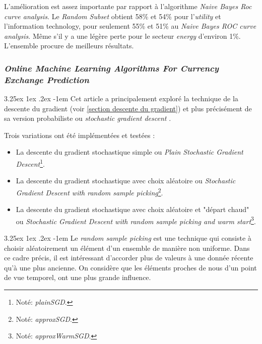 \documentclass[a4paper, 11pt]{article}
\makeatletter
\newcounter{subsubsubsection}[subsubsection]
\renewcommand\paragraph{\@startsection{paragraph}{5}{\z@}%
  {3.25ex \@plus1ex \@minus.2ex}%
  {-1em}%
  {\normalfont\normalsize\bfseries}}
\makeatother
\begin{document}
L'amélioration est assez importante par rapport à l'algorithme \textit{Naive Bayes Roc curve analysis}. 
Le \textit{Random Subset} obtient 58\% et 54\% pour l'\textit{utility} et l'{information technology}, pour seulement 
55\% et 51\% au \textit{Naive Bayes ROC curve analysis}. Même s'il y a une légère perte pour le secteur 
\textit{energy} d'environ 1\%.
L'ensemble procure de meilleurs résultats.

\subsubsection{\textit{Online Machine Learning Algorithms For Currency Exchange Prediction}}

\paragraph{}
Cet article a principalement exploré la technique de la descente du gradient 
(voir \ref{section descente du gradient}) et plus précisément de sa version probabiliste ou
\textit{stochastic gradient descent} \cite{descente_du_gradient_stochastique}.

Trois variations ont été implémentées et testées :
\begin{itemize}
\item La descente du gradient stochastique simple ou \textit{Plain Stochastic Gradient Descent}\footnote{Noté: \textit{plainSGD}.}.
\item La descente du gradient stochastique avec choix aléatoire ou \textit{Stochastic Gradient Descent with random sample picking}\footnote{Noté: \textit{approxSGD}.}.
\item La descente du gradient stochastique avec choix aléatoire et "départ chaud" ou \textit{Stochastic Gradient Descent with random sample picking and warm start}\footnote{Noté: \textit{approxWarmSGD}.}.
\end{itemize}

\paragraph{}
Le \textit{random sample picking} est une technique qui consiste à choisir aléatoirement un élément d'un ensemble
de manière non uniforme. Dans ce cadre précis, il est intéressant d'accorder plus de valeurs à une donnée
récente qu'à une plus ancienne. On considère que les éléments proches de nous d'un point de vue temporel,
ont une plus grande influence.
\end{document}
